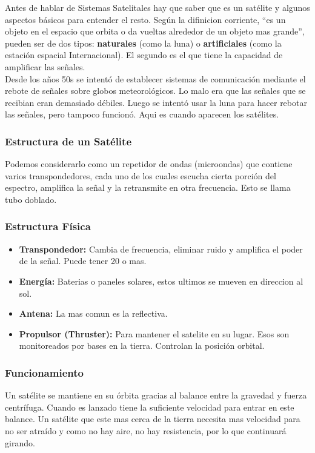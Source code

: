 Antes de hablar de Sistemas Satelitales hay que saber que es un satélite y algunos aspectos básicos para entender el resto. Según la difinicion corriente, ``es un objeto en el espacio que orbita o da vueltas alrededor de un objeto mas grande'', pueden ser de dos tipos: \textbf{naturales} (como la luna) o \textbf{artificiales} (como la estación espacial Internacional). El segundo es el que tiene la capacidad de amplificar las señales. 
\\${ }$\\
Desde los años 50s se intentó de establecer sistemas de comunicación mediante el rebote de señales sobre globos meteorológicos. Lo malo era que las señales que se recibian eran demasiado débiles. Luego se intentó usar la luna para hacer rebotar las señales, pero tampoco funcionó. Aqui es cuando aparecen los satélites.
\subsubsection*{Estructura de un Satélite}
Podemos considerarlo como un repetidor de ondas (microondas) que contiene varios transpondedores, cada uno de los cuales escucha cierta porción del espectro, amplifica la señal y la retransmite en otra frecuencia. Esto se llama tubo doblado.
\subsubsection*{Estructura Física}
\begin{itemize}
\item \textbf{Transpondedor:} Cambia de frecuencia, eliminar ruido y amplifica el poder de la señal. Puede tener 20 o mas.
\item \textbf{Energía:} Baterias o paneles solares, estos ultimos se mueven en direccion al sol.
\item \textbf{Antena:} La mas comun es la reflectiva.
\item \textbf{Propulsor (Thruster):} Para mantener el satelite en su lugar. Esos son monitoreados por bases en la tierra. Controlan la posición orbital.
\end{itemize}
\subsubsection*{Funcionamiento}
Un satélite se mantiene en su órbita gracias al balance entre la gravedad y fuerza centrífuga. Cuando es lanzado tiene la suficiente velocidad para entrar en este balance. Un satélite que este mas cerca de la tierra necesita mas velocidad para no ser atraído y como no hay aire, no hay resistencia, por lo que continuará girando. 
